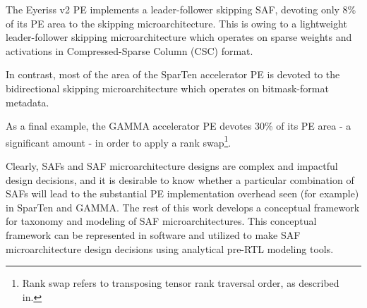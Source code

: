 The Eyeriss v2\cite{eyerissv2} PE implements a leader-follower skipping SAF, devoting only 8\% of its PE area to the skipping microarchitecture. This is owing to a lightweight leader-follower skipping microarchitecture which operates on sparse weights and activations in Compressed-Sparse Column (CSC) format. 

In contrast, most of the area of the SparTen\cite{sparten} accelerator PE is devoted to the bidirectional skipping microarchitecture which operates on bitmask-format metadata.

As a final example, the GAMMA\cite{gamma} accelerator PE devotes 30\% of its PE area - a significant amount - in order to apply a rank swap\footnote{Rank swap refers to transposing tensor rank traversal order, as described in\cite{sparse_arch_lecture1}.}. 

Clearly, SAFs and SAF microarchitecture designs are complex and impactful design decisions, and it is desirable to know whether a particular combination of SAFs will lead to the substantial PE implementation overhead seen (for example) in SparTen and GAMMA. The rest of this work develops a conceptual framework for taxonomy and modeling of SAF microarchitectures. This conceptual framework can be represented in software and utilized to make SAF microarchitecture design decisions using analytical pre-RTL modeling tools.

